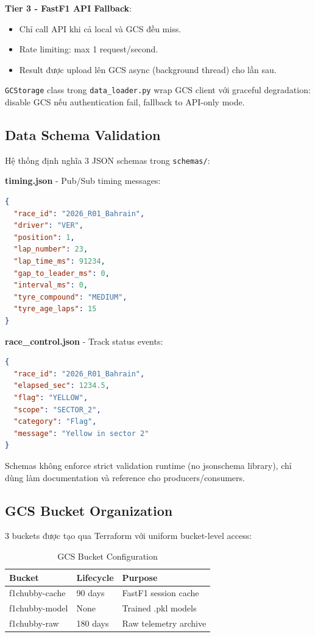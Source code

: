 \documentclass[conference,10pt]{IEEEtran}
\begin{document}
\textbf{Tier 3 - FastF1 API Fallback}:
\begin{itemize}
    \item Chỉ call API khi cả local và GCS đều miss.
    \item Rate limiting: max 1 request/second.
    \item Result được upload lên GCS async (background thread) cho lần sau.
\end{itemize}

\texttt{GCStorage} class trong \texttt{data\_loader.py} wrap GCS client với graceful degradation: disable GCS nếu authentication fail, fallback to API-only mode.

\subsection{Data Schema Validation}

Hệ thống định nghĩa 3 JSON schemas trong \texttt{schemas/}:

\textbf{timing.json} - Pub/Sub timing messages:
\begin{lstlisting}[language=json]
{
  "race_id": "2026_R01_Bahrain",
  "driver": "VER",
  "position": 1,
  "lap_number": 23,
  "lap_time_ms": 91234,
  "gap_to_leader_ms": 0,
  "interval_ms": 0,
  "tyre_compound": "MEDIUM",
  "tyre_age_laps": 15
}
\end{lstlisting}

\textbf{race\_control.json} - Track status events:
\begin{lstlisting}[language=json]
{
  "race_id": "2026_R01_Bahrain",
  "elapsed_sec": 1234.5,
  "flag": "YELLOW",
  "scope": "SECTOR_2",
  "category": "Flag",
  "message": "Yellow in sector 2"
}
\end{lstlisting}

Schemas không enforce strict validation runtime (no jsonschema library), chỉ dùng làm documentation và reference cho producers/consumers.

\subsection{GCS Bucket Organization}

3 buckets được tạo qua Terraform với uniform bucket-level access:

\begin{table}[h]
\centering
\small
\begin{tabular}{@{}lll@{}}
\toprule
\textbf{Bucket} & \textbf{Lifecycle} & \textbf{Purpose} \\
\midrule
f1chubby-cache & 90 days & FastF1 session cache \\
f1chubby-model & None & Trained .pkl models \\
f1chubby-raw & 180 days & Raw telemetry archive \\
\bottomrule
\end{tabular}
\caption{GCS Bucket Configuration}
\end{table}
\end{document}
